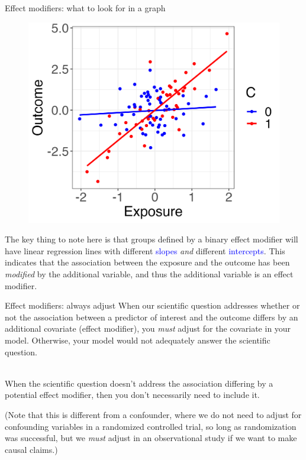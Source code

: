 \documentclass[10pt,t]{beamer}
\begin{document}
\begin{frame}{Effect modifiers: what to look for in a graph}

\begin{figure}
	\centering \includegraphics[scale=0.4]{p4.png}
\end{figure}

\vspace{0.3cm}

The key thing to note here is that groups defined by a binary effect modifier will have linear regression lines with different \textcolor{blue}{slopes} \textit{and} different \textcolor{blue}{intercepts}. This indicates that the association between the exposure and the outcome has been \textit{modified} by the additional variable, and thus the additional variable is an effect modifier.

\end{frame}

\begin{frame}{Effect modifiers: always adjust}
When our scientific question addresses whether or not the association between a predictor of interest and the outcome differs by an additional covariate (effect modifier), you \textit{must} adjust for the covariate in your model. Otherwise, your model would not adequately answer the scientific question.
\\ ~\ 

When the scientific question doesn't address the association differing by a potential effect modifier, then you don't necessarily need to include it. 

\vspace{0.3cm}

(Note that this is different from a confounder, where we do not need to adjust for confounding variables in a randomized controlled trial, so long as randomization was successful, but we \textit{must} adjust in an observational study if we want to make causal claims.)


\end{frame}
\end{document}
